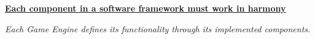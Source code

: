 


\begin{center}
  \underline{\textbf{Each component in a software framework must work in harmony}}

  \emph{Each Game Engine defines its functionality through its implemented components.}
\end{center}




